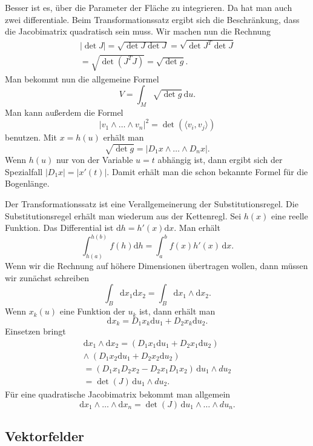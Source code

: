 \documentclass[a4paper,10pt,fleqn,twocolumn,twoside]{article}
\begin{document}
Besser ist es, über die Parameter der Fläche zu integrieren.
Da hat man auch zwei differentiale. Beim Transformationssatz ergibt
sich die Beschränkung, dass die Jacobimatrix quadratisch sein muss.
Wir machen nun die Rechnung
\begin{gather*}
|{\det J}| = \sqrt{\det J\det J}
= \sqrt{\det J^T\det J}\\
= \sqrt{\det(J^TJ)} = \sqrt{\det g}.
\end{gather*}
Man bekommt nun die allgemeine Formel
\[V = \int_M \sqrt{\det g}\,\mathrm du.\]
Man kann außerdem die Formel
\[|v_1\wedge\ldots\wedge v_n|^2 = \det(\langle v_i,v_j\rangle)\]
benutzen. Mit \(x=h(u)\) erhält man
\[\sqrt{\det g} = |D_1 x\wedge\ldots\wedge D_n x|.\]
Wenn \(h(u)\) nur von der Variable \(u=t\) abhängig ist, dann ergibt
sich der Spezialfall \(|D_1 x| = |x'(t)|\). Damit erhält man die schon
bekannte Formel für die Bogenlänge.

Der Transformationssatz ist eine Verallgemeinerung der
Substitutionsregel. Die Substitutionsregel erhält man wiederum aus
der Kettenregl. Sei \(h(x)\) eine reelle Funktion.
Das Differential ist \(\mathrm dh = h'(x)\mathrm dx\). Man erhält
\[\int_{h(a)}^{h(b)} f(h)\mathrm dh = \int_a^b f(x) h'(x)\,\mathrm dx.\]
Wenn wir die Rechnung auf höhere Dimensionen übertragen wollen, dann
müssen wir zunächst schreiben
\[\int_B \mathrm dx_1\mathrm dx_2 = \int_B \mathrm dx_1\wedge\mathrm dx_2.\]
Wenn \(x_k(u)\) eine Funktion der \(u_k\) ist, dann erhält man
\[\mathrm dx_k = D_1x_k\mathrm du_1+D_2x_k\mathrm du_2.\]
Einsetzen bringt
\begin{gather*}
\mathrm dx_1\wedge\mathrm dx_2
= (D_1x_1\mathrm du_1+D_2x_1\mathrm du_2)\\
\wedge\; (D_1x_2\mathrm du_1+D_2x_2\mathrm du_2)\\
= (D_1 x_1 D_2 x_2 - D_2 x_1 D_1 x_2)\,\mathrm du_1\wedge du_2\\
= \det(J)\,\mathrm du_1\wedge du_2.
\end{gather*}
Für eine quadratische Jacobimatrix bekommt man allgemein
\[\mathrm dx_1\wedge\ldots\wedge\mathrm dx_n
= \det(J)\,\mathrm du_1\wedge\ldots\wedge du_n.\]


\subsection{Vektorfelder}
\end{document}
